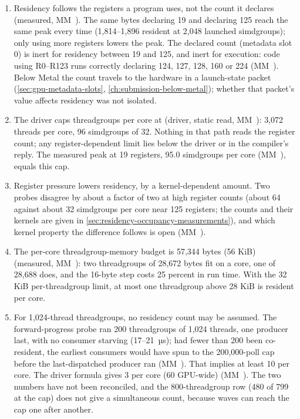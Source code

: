 \begin{enumerate}
\def\labelenumi{\arabic{enumi}.}
\item Residency follows the registers a program uses, not the count it declares (measured, MM~). The same bytes
  declaring 19 and declaring 125 reach the same peak every time (1,814–1,896 resident at 2,048 launched simdgroups); only
  using more registers lowers the peak. The declared count (metadata slot 0) is inert for residency between 19 and
  125, and inert for execution: code using R0–R123 runs correctly declaring 124, 127, 128, 160 or 224 (MM~).
  Below Metal the count travels to the hardware in a launch-state packet (\cref{sec:gpu-metadata-slots}, \cref{ch:submission-below-metal}); whether that
  packet's value affects residency was not isolated.
\item The driver caps threadgroups per core at  (driver, static read,
  MM~): 3,072 threads per core, 96 simdgroups of 32. Nothing in that path reads the register count; any
  register-dependent limit lies below the driver or in the compiler's reply. The measured peak at 19 registers,
  95.0 simdgroups per core (MM~), equals this cap.
\item Register pressure lowers residency, by a kernel-dependent amount. Two probes disagree by about a factor of two
  at high register counts (about 64 against about 32 simdgroups per core near 125 registers; the counts and their
  kernels are given in \cref{sec:residency-occupancy-measurements}), and which kernel property the difference follows is
  open (MM~).
\item The per-core threadgroup-memory budget is 57,344 bytes (56 KiB) (measured, MM~): two threadgroups of
  28,672 bytes fit on a core, one of 28,688 does, and the 16-byte step costs 25 percent in run time. With the 32 KiB per-threadgroup
  limit, at most one threadgroup above 28 KiB is resident per core.
\item For 1,024-thread threadgroups, no residency count may be assumed. The forward-progress probe ran 200 threadgroups of
  1,024 threads, one producer last, with no consumer starving (17–21~µs); had fewer than 200 been co-resident, the
  earliest consumers would have spun to the 200,000-poll cap before the last-dispatched producer ran (MM~).
  That implies at least 10 per core. The driver formula gives 3 per core (60 GPU-wide) (MM~). The two numbers
  have not been reconciled, and the 800-threadgroup row (480 of 799 at the cap) does not give a simultaneous count,
  because waves can reach the cap one after another.
\end{enumerate}

